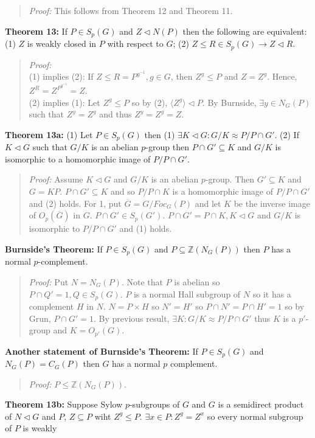\begin{quote}
\emph{Proof:}  
This follows from Theorem 12 and Theorem 11.
\end{quote}
{\bf Theorem 13:} If
$P \in S_p(G)$ and $Z \lhd N(P)$ then the following are equivalent:
(1) $Z$ is weakly closed in $P$ with respect to $G$;
(2) $Z \le R \in S_p(G) \rightarrow Z \lhd R$.
\begin{quote}
\emph{Proof:} 
\\
(1) implies (2): If $Z \le R = P^{g^{-1}}, g \in G$, then $Z^g \le P$ and $Z=Z^g$.
Hence, $Z^R= Z^{P^{g^{-1}}} = Z$.\\
(2) implies (1):  Let $Z^g \le P$ so by (2), $ \langle Z^g \rangle \lhd P$.  
By Burnside, $\exists y \in N_G(P)$
such that  $Z^y=Z^g$ and thus $Z^y=Z^g=Z$.
\end{quote}
{\bf Theorem 13a:}  (1) Let $P \in S_p(G)$ then (1) $\exists K \lhd G: G/K \approx P/ P \cap G'$.
(2) If $K \lhd G$ such that $G/K$ is an abelian $p$-group then $P \cap G' \subseteq K$ 
and $G/K$ is isomorphic to a homomorphic image of $P/P \cap G'$.
\begin{quote}
\emph{Proof:}  Assume $K \lhd G$ and $G/K$ is an abelian $p$-group.  Then $G' \subseteq K$ and
$G= KP$.  $P \cap G' \subseteq K$ and so $P/P \cap K$ is a homomorphic image of $P/P \cap G'$ and (2)
holds.  For 1, put ${\overline G} = G/Foc_G(P)$ and let
$K$ be the inverse image of $O_{p}({\overline G})$
in $G$.  $P \cap G' \in S_p(G')$.  
$P \cap G' = P \cap K, K \lhd G$ and $G/K$ is isomorphic to $P/P \cap G'$ and (1) holds.
\end{quote}
{\bf Burnside's Theorem:} 
If $P \in S_p(G)$ and $P \subseteq {\mathbb Z}(N_G(P))$ then $P$ has a normal
$p$-complement.
\begin{quote}
\emph{Proof:}  Put $N=N_G(P)$.  Note that $P$ is abelian so $P \cap Q'= 1, Q \in S_p(G)$.
$P$ is a normal Hall subgroup of $N$ so it has a complement $H$ in $N$.  $N= P \times H$ so
$N' = H'$ so $P \cap N' = P \cap H' = 1$ so by Grun, $P \cap G'=1$.  By previous result, $\exists K:
G/K \approx P/P \cap G'$ thus $K$ is a $p'$-group and $K= O_{p'}(G)$.
\end{quote}
{\bf Another statement of Burnside's Theorem:} 
If $P \in S_p(G)$ and $N_G(P) = C_G(P)$ then $G$ has a normal $p$ complement.
\begin{quote}
\emph{Proof:} 
$P \leq {\mathbb Z}(N_G(P))$.
\end{quote}
{\bf Theorem 13b:} Suppose Sylow $p$-subgroups of $G$ and $G$ is a semidirect product of $N \lhd G$ and $P$,
$Z \subseteq P$ wiht $Z^g \leq P$. $\exists x \in P: Z^g = Z^x$ so every normal subgroup of $P$ is weakly

